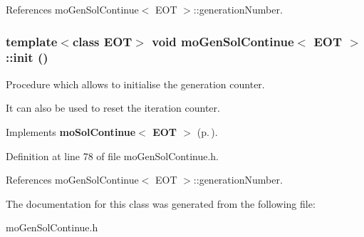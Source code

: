 References mo\-Gen\-Sol\-Continue$<$ EOT $>$::generation\-Number.
\subsubsection{\setlength{\rightskip}{0pt plus 5cm}template$<$class EOT$>$ void {\bf mo\-Gen\-Sol\-Continue}$<$ EOT $>$::init ()\hspace{0.3cm}{\tt  [inline, virtual]}}\label{classmo_gen_sol_continue_a2}


Procedure which allows to initialise the generation counter. 

It can also be used to reset the iteration counter. 

Implements {\bf mo\-Sol\-Continue$<$ EOT $>$} {\rm (p.\,\pageref{classmo_sol_continue_a0})}.

Definition at line 78 of file mo\-Gen\-Sol\-Continue.h.

References mo\-Gen\-Sol\-Continue$<$ EOT $>$::generation\-Number.

The documentation for this class was generated from the following file:\begin{CompactItemize}
\item 
mo\-Gen\-Sol\-Continue.h\end{CompactItemize}
